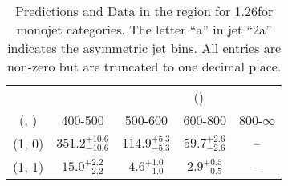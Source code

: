 \begin{table}[h!]
\tiny
\centering
\caption{Predictions and Data in the \gj region for 1.26\ifb for monojet categories. The letter ``a'' in jet \eg ``2a''  indicates the asymmetric jet bins. All entries are non-zero but are truncated to one decimal place.\label{tab:yieldsseppost_gj_ewk_mono}}
\begin{tabular}
{ccccc}
	\hline\hline
&	& \multicolumn{4}{c}{\scalht (\gev)} \\ 
	 (\njet,  \nb) & 400-500 & 500-600 & 600-800 & 800-$\infty$ \\ [0.8ex] 
\hline
	(1, 0) & $351.2^{+ 10.6 }_{- 10.6 }$ & $114.9^{+ 5.3 }_{- 5.3 }$ & $59.7^{+ 2.6 }_{- 2.6 }$ & -- \\[0.5ex] 
	(1, 1) & $15.0^{+ 2.2 }_{- 2.2 }$ & $4.6^{+ 1.0 }_{- 1.0 }$ & $2.9^{+ 0.5 }_{- 0.5 }$ & -- \\[0.5ex] 
	\hline
	\hline
\end{tabular}
\end{table}
